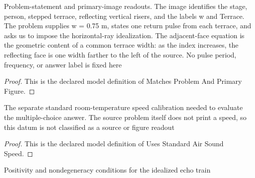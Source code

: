 \begin{definition}
  \label{def:physics:phyx-mini-0310:phyxminiproblems-problemphyxmini0310-matchesproblemandprimaryfigure}
  Problem-statement and primary-image readouts. The image identifies the stage, person, stepped terrace, reflecting vertical risers, and the labels w and Terrace. The problem supplies w = 0.75 m, states one return pulse from each terrace, and asks us to impose the horizontal-ray idealization. The adjacent-face equation is the geometric content of a common terrace width: as the index increases, the reflecting face is one width farther to the left of the source. No pulse period, frequency, or answer label is fixed here
\end{definition}
\begin{proof}
  This is the declared model definition of Matches Problem And Primary Figure.
\end{proof}
\begin{definition}
  \label{def:physics:phyx-mini-0310:phyxminiproblems-problemphyxmini0310-usesstandardairsoundspeed}
  The separate standard room-temperature speed calibration needed to evaluate the multiple-choice answer. The source problem itself does not print a speed, so this datum is not classified as a source or figure readout
\end{definition}
\begin{proof}
  This is the declared model definition of Uses Standard Air Sound Speed.
\end{proof}
\begin{definition}
  \label{def:physics:phyx-mini-0310:phyxminiproblems-problemphyxmini0310-hasphysicalechoparameters}
  Positivity and nondegeneracy conditions for the idealized echo train
\end{definition}
